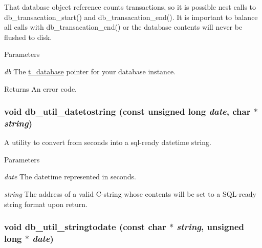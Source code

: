 That database object reference counts transactions, so it is possible nest calls to db\_\-transacation\_\-start() and db\_\-transacation\_\-end(). It is important to balance all calls with db\_\-transacation\_\-end() or the database contents will never be flushed to disk.


\begin{DoxyParams}{Parameters}
\item[{\em db}]The \hyperlink{group__database_gad832ea0e5fc292661fd20046cee7e3b3}{t\_\-database} pointer for your database instance. \end{DoxyParams}
\begin{DoxyReturn}{Returns}
An error code. 
\end{DoxyReturn}
\hypertarget{group__database_gabf7cfbf2e7218680a8b79d250c1eae19}{
\subsubsection[{db\_\-util\_\-datetostring}]{\setlength{\rightskip}{0pt plus 5cm}void db\_\-util\_\-datetostring (const unsigned long {\em date}, \/  char $\ast$ {\em string})}}
\label{group__database_gabf7cfbf2e7218680a8b79d250c1eae19}


A utility to convert from seconds into a sql-\/ready datetime string. 
\begin{DoxyParams}{Parameters}
\item[{\em date}]The datetime represented in seconds. \item[{\em string}]The address of a valid C-\/string whose contents will be set to a SQL-\/ready string format upon return. \end{DoxyParams}
\hypertarget{group__database_ga051ca3fefd1d2e4fe162a943c3d15060}{
\subsubsection[{db\_\-util\_\-stringtodate}]{\setlength{\rightskip}{0pt plus 5cm}void db\_\-util\_\-stringtodate (const char $\ast$ {\em string}, \/  unsigned long $\ast$ {\em date})}}
\label{group__database_ga051ca3fefd1d2e4fe162a943c3d15060}


